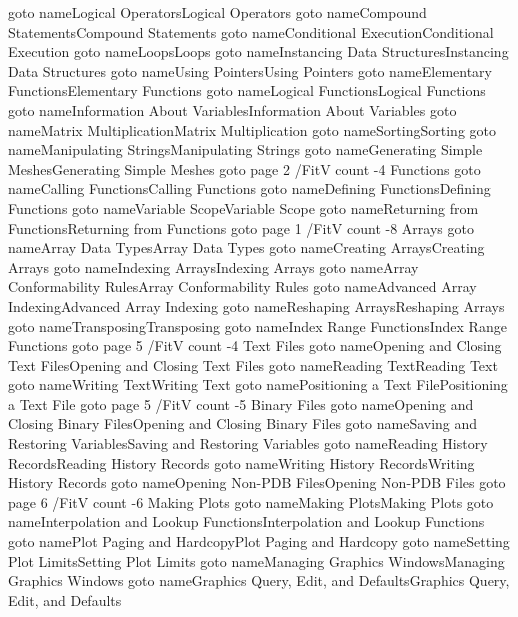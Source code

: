       \pdfoutline goto name{Logical Operators}{Logical Operators}
      \pdfoutline goto name{Compound Statements}{Compound Statements}
      \pdfoutline goto name{Conditional Execution}{Conditional Execution}
      \pdfoutline goto name{Loops}{Loops}
      \pdfoutline goto name{Instancing Data Structures}{Instancing Data Structures}
      \pdfoutline goto name{Using Pointers}{Using Pointers}
      \pdfoutline goto name{Elementary Functions}{Elementary Functions}
      \pdfoutline goto name{Logical Functions}{Logical Functions}
      \pdfoutline goto name{Information About Variables}{Information About Variables}
      \pdfoutline goto name{Matrix Multiplication}{Matrix Multiplication}
      \pdfoutline goto name{Sorting}{Sorting}
      \pdfoutline goto name{Manipulating Strings}{Manipulating Strings}
      \pdfoutline goto name{Generating Simple Meshes}{Generating Simple Meshes}
    \pdfoutline goto page 2 {/FitV} count -4 {Functions}
      \pdfoutline goto name{Calling Functions}{Calling Functions}
      \pdfoutline goto name{Defining Functions}{Defining Functions}
      \pdfoutline goto name{Variable Scope}{Variable Scope}
      \pdfoutline goto name{Returning from Functions}{Returning from Functions}
    \pdfoutline goto page 1 {/FitV} count -8 {Arrays}
      \pdfoutline goto name{Array Data Types}{Array Data Types}
      \pdfoutline goto name{Creating Arrays}{Creating Arrays}
      \pdfoutline goto name{Indexing Arrays}{Indexing Arrays}
      \pdfoutline goto name{Array Conformability Rules}{Array Conformability Rules}
      \pdfoutline goto name{Advanced Array Indexing}{Advanced Array Indexing}
      \pdfoutline goto name{Reshaping Arrays}{Reshaping Arrays}
      \pdfoutline goto name{Transposing}{Transposing}
      \pdfoutline goto name{Index Range Functions}{Index Range Functions}
    \pdfoutline goto page 5 {/FitV} count -4 {Text Files}
      \pdfoutline goto name{Opening and Closing Text Files}{Opening and Closing Text Files}
      \pdfoutline goto name{Reading Text}{Reading Text}
      \pdfoutline goto name{Writing Text}{Writing Text}
      \pdfoutline goto name{Positioning a Text File}{Positioning a Text File}
    \pdfoutline goto page 5 {/FitV} count -5 {Binary Files}
      \pdfoutline goto name{Opening and Closing Binary Files}{Opening and Closing Binary Files}
      \pdfoutline goto name{Saving and Restoring Variables}{Saving and Restoring Variables}
      \pdfoutline goto name{Reading History Records}{Reading History Records}
      \pdfoutline goto name{Writing History Records}{Writing History Records}
      \pdfoutline goto name{Opening Non-PDB Files}{Opening Non-PDB Files}
    \pdfoutline goto page 6 {/FitV} count -6 {Making Plots}
      \pdfoutline goto name{Making Plots}{Making Plots}
      \pdfoutline goto name{Interpolation and Lookup Functions}{Interpolation and Lookup Functions}
      \pdfoutline goto name{Plot Paging and Hardcopy}{Plot Paging and Hardcopy}
      \pdfoutline goto name{Setting Plot Limits}{Setting Plot Limits}
      \pdfoutline goto name{Managing Graphics Windows}{Managing Graphics Windows}
      \pdfoutline goto name{Graphics Query, Edit, and Defaults}{Graphics Query, Edit, and Defaults}
\fi

